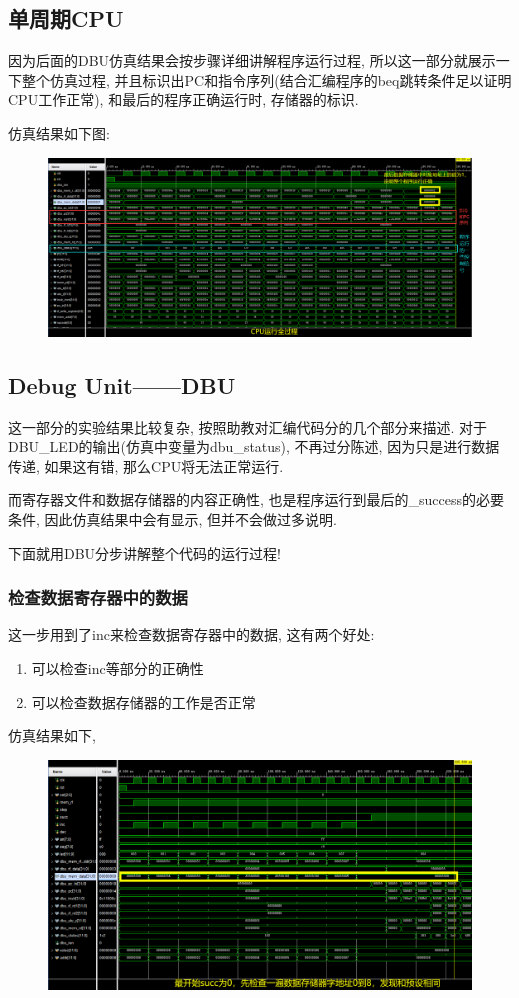 \documentclass[UTF8]{article}
\begin{document}
\subsection{单周期CPU}
因为后面的DBU仿真结果会按步骤详细讲解程序运行过程, 所以这一部分就展示一下整个仿真过程, 并且标识出PC和指令序列(结合汇编程序的beq跳转条件足以证明CPU工作正常), 和最后的程序正确运行时, 存储器的标识.\par
仿真结果如下图:\par
\begin{figure}[H]
	\centering
	\includegraphics[width=\linewidth]{cpu.png}
\end{figure}
\subsection{Debug Unit——DBU}
这一部分的实验结果比较复杂, 按照助教对汇编代码分的几个部分来描述.
对于DBU\_LED的输出(仿真中变量为dbu\_status), 不再过分陈述, 因为只是进行数据传递, 如果这有错, 那么CPU将无法正常运行.\par
而寄存器文件和数据存储器的内容正确性, 也是程序运行到最后的\_success的必要条件, 因此仿真结果中会有显示, 但并不会做过多说明.\par
下面就用DBU分步讲解整个代码的运行过程!\par
\subsubsection{检查数据寄存器中的数据}
这一步用到了inc来检查数据寄存器中的数据, 这有两个好处:
\begin{enumerate}
	\item 可以检查inc等部分的正确性
	\item 可以检查数据存储器的工作是否正常
\end{enumerate}
仿真结果如下,
\begin{figure}[H]
	\centering
	\includegraphics[width=\linewidth]{mem_data.png}
\end{figure}
\end{document}
